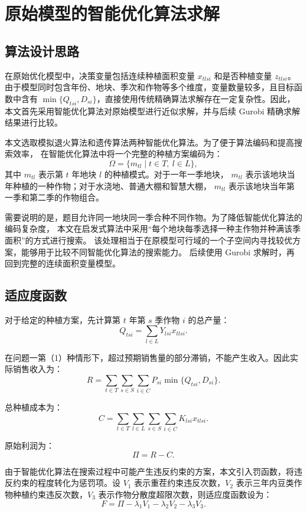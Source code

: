 \documentclass[12pt,a4paper]{ctexart}
\begin{document}
\section{原始模型的智能优化算法求解}

\subsection{算法设计思路}

在原始优化模型中，决策变量包括连续种植面积变量 $x_{tlsi}$ 和是否种植变量 $z_{tlsi}$。
由于模型同时包含年份、地块、季次和作物等多个维度，变量数量较多，且目标函数中含有
$\min\{Q_{tsi},D_{si}\}$，直接使用传统精确算法求解存在一定复杂性。因此，本文首先采用智能优化算法对原始模型进行近似求解，并与后续 Gurobi 精确求解结果进行比较。

本文选取模拟退火算法和遗传算法两种智能优化算法。为了便于算法编码和提高搜索效率，
在智能优化算法中将一个完整的种植方案编码为：
\[
\Omega=\{m_{tl}\mid t\in T,\ l\in L\},
\]
其中 $m_{tl}$ 表示第 $t$ 年地块 $l$ 的种植模式。对于一年一季地块，
$m_{tl}$ 表示该地块当年种植的一种作物；对于水浇地、普通大棚和智慧大棚，
$m_{tl}$ 表示该地块当年第一季和第二季的作物组合。

需要说明的是，题目允许同一地块同一季合种不同作物。为了降低智能优化算法的编码复杂度，
本文在启发式算法中采用“每个地块每季选择一种主作物并种满该季面积”的方式进行搜索。
该处理相当于在原模型可行域的一个子空间内寻找较优方案，能够用于比较不同智能优化算法的搜索能力。
后续使用 Gurobi 求解时，再回到完整的连续面积变量模型。

\subsection{适应度函数}

对于给定的种植方案，先计算第 $t$ 年第 $s$ 季作物 $i$ 的总产量：
\[
Q_{tsi}=\sum_{l\in L}Y_{lsi}x_{tlsi}.
\]

在问题一第（1）种情形下，超过预期销售量的部分滞销，不能产生收入。因此实际销售收入为：
\[
R=\sum_{t\in T}\sum_{s\in S}\sum_{i\in C}
P_{si}\min\{Q_{tsi},D_{si}\}.
\]

总种植成本为：
\[
C=\sum_{t\in T}\sum_{l\in L}\sum_{s\in S}\sum_{i\in C}
K_{lsi}x_{tlsi}.
\]

原始利润为：
\[
\Pi=R-C.
\]

由于智能优化算法在搜索过程中可能产生违反约束的方案，本文引入罚函数，将违反约束的程度转化为惩罚项。设 $V_1$ 表示重茬约束违反次数，$V_2$ 表示三年内豆类作物种植约束违反次数，$V_3$ 表示作物分散度超限次数，则适应度函数设为：
\[
F=\Pi-\lambda_1V_1-\lambda_2V_2-\lambda_3V_3.
\]
\end{document}
